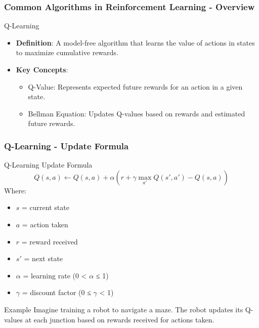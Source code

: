\documentclass[aspectratio=169]{beamer}
\begin{document}
\begin{frame}[fragile]
    \frametitle{Common Algorithms in Reinforcement Learning - Overview}
    \begin{block}{Q-Learning}
        \begin{itemize}
            \item \textbf{Definition}: A model-free algorithm that learns the value of actions in states to maximize cumulative rewards.
            \item \textbf{Key Concepts}:
                \begin{itemize}
                    \item Q-Value: Represents expected future rewards for an action in a given state.
                    \item Bellman Equation: Updates Q-values based on rewards and estimated future rewards.
                \end{itemize}
        \end{itemize}
    \end{block}
\end{frame}

\begin{frame}[fragile]
    \frametitle{Q-Learning - Update Formula}
    \begin{block}{Q-Learning Update Formula}
        \begin{equation}
            Q(s, a) \leftarrow Q(s, a) + \alpha \left( r + \gamma \max_{a'} Q(s', a') - Q(s, a) \right)
        \end{equation}
        Where:
        \begin{itemize}
            \item \( s \) = current state
            \item \( a \) = action taken
            \item \( r \) = reward received
            \item \( s' \) = next state
            \item \( \alpha \) = learning rate (0 < \(\alpha\) ≤ 1)
            \item \( \gamma \) = discount factor (0 ≤ \(\gamma\) < 1)
        \end{itemize}
    \end{block}
    
    \begin{block}{Example}
        Imagine training a robot to navigate a maze. The robot updates its Q-values at each junction based on rewards received for actions taken.
    \end{block}
\end{frame}
\end{document}
